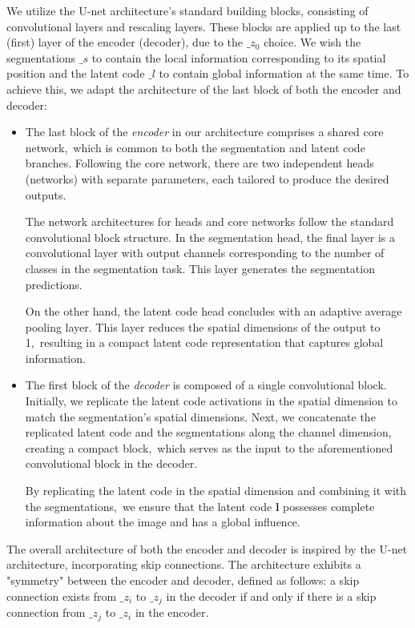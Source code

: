  We utilize the U-net architecture's standard building blocks, consisting of convolutional layers and rescaling layers.
 These blocks are applied up to the last (first) layer of the encoder (decoder), due to the $\_z_0$ choice. 
 We wish the segmentations $\_s$ to contain the local information corresponding to its spatial position and the latent code $\_l$ to
 contain global information at the same time. To achieve this, we adapt the architecture of the last block of both the encoder and decoder:

 \begin{itemize}
    \item The last block of the \textit{encoder} in our architecture comprises a shared core network,~which 
    is common to both the segmentation and latent code branches. Following the core network, there 
    are two independent heads (networks) with separate parameters, each tailored to produce the 
    desired outputs.

    The network architectures for heads and core networks follow the standard convolutional block structure. 
    In the segmentation head, the final layer is a convolutional layer with output channels corresponding 
    to the number of classes in the segmentation task. This layer generates the segmentation predictions.
    
    On the other hand, the latent code head concludes with an adaptive average pooling layer. This layer
    reduces the spatial dimensions of the output to 1,~resulting in a compact latent code representation
    that captures global information.
   

    \item The first block of the \textit{decoder} is composed of a single convolutional block. Initially, we replicate the latent
    code activations in the spatial dimension to match the segmentation's spatial dimensions. Next, we concatenate
    the replicated latent code and the segmentations along the channel dimension, creating a compact block,~which 
    serves as the input to the aforementioned convolutional block in the decoder.

    By replicating the latent code in the spatial dimension and combining it with the segmentations,~we ensure that the
    latent code $\mathbf{l}$ possesses complete information about the image and has a global influence. 
\end{itemize}

The overall architecture of both the encoder and decoder is inspired by the U-net architecture, incorporating skip connections. 
The architecture exhibits a "symmetry" between the encoder and decoder, defined as follows: a skip connection exists from $\_z_i$ to $\_z_j$ in
the decoder if and only if there is a skip connection from $\_z_j$ to $\_z_i$ in the encoder. 

